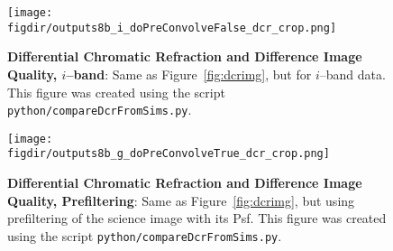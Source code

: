 \documentclass[prd, nofootinbib, floatfix, 11pt, tightenlines, times]{article}
\def\figdir{../figures}
\begin{document}
\begin{appendices}
\begin{figure}[!ht]
  \centering
  \texttt{[image: \\figdir/outputs8b\_i\_doPreConvolveFalse\_dcr\_crop.png]}
  \caption{{\bf Differential Chromatic Refraction and Difference Image
      Quality, $i$--band}: Same as Figure~\ref{fig:dcrimg}, but for
    $i$--band data.  This figure was created using the script {\tt
      python/compareDcrFromSims.py}.}
  \label{fig:dcrimi}
\end{figure}

\begin{figure}[!ht]
  \centering
  \texttt{[image: \\figdir/outputs8b\_g\_doPreConvolveTrue\_dcr\_crop.png]}
  \caption{{\bf Differential Chromatic Refraction and Difference Image
      Quality, Prefiltering}: Same as Figure~\ref{fig:dcrimg}, but
    using prefiltering of the science image with its Psf.  This figure
    was created using the script {\tt python/compareDcrFromSims.py}.}
  \label{fig:dcrimgpre}
\end{figure}


\end{appendices}
\end{document}
